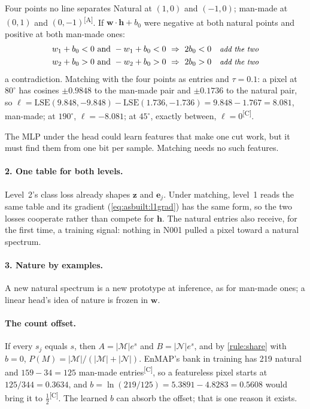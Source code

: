 \documentclass[11pt,a4paper,oneside,openany]{book}
\newcommand{\B}[1]{{\symbf{#1}}}
\newcommand{\B}[1]{{\bm{#1}}}
\newcommand{\comp}{\textsuperscript{\textsf{\scriptsize[C]}}}
\newcommand{\assm}{\textsuperscript{\textsf{\scriptsize[A]}}}
\newcommand{\ve}{\B{e}}
\newcommand{\vw}{\B{w}}
\newcommand{\vz}{\B{z}}
\newcommand{\vh}{\B{h}}
\newcommand{\why}[1]{&&\text{\small\itshape #1}}
\begin{document}
\begin{worked}[label=we:asbuilt:xor]{Four points no line separates}
Natural at $(1,0)$ and $(-1,0)$; man-made at $(0,1)$ and $(0,-1)$\assm. If $\vw\cdot\vh+b_0$ were negative at both natural points and positive at both man-made ones:
\begin{align*}
w_1+b_0<0\ \text{and}\ -w_1+b_0<0 &\ \Rightarrow\ 2b_0<0 \why{add the two}\\
w_2+b_0>0\ \text{and}\ -w_2+b_0>0 &\ \Rightarrow\ 2b_0>0 \why{add the two}
\end{align*}
a contradiction. Matching with the four points as entries and $\tau=0.1$: a pixel at $80^\circ$ has cosines $\pm0.9848$ to the man-made pair and $\pm0.1736$ to the natural
pair, so $\ell=\mathrm{LSE}(9.848,-9.848)-\mathrm{LSE}(1.736,-1.736)=9.848-1.767=8.081$, man-made; at $190^\circ$, $\ell=-8.081$; at $45^\circ$, exactly between, $\ell=0$\comp.
\end{worked}

The MLP under the head could learn features that make one cut work, but it must find them from one bit per sample. Matching needs no such features.

\paragraph{2. One table for both levels.} Level~2's class loss already shapes $\vz$ and $\ve_j$. Under matching, level~1 reads the same table and its gradient
(\cref{eq:asbuilt:l1grad}) has the same form, so the two losses cooperate rather than compete for $\vh$. The natural entries also receive, for the first time, a training
signal: nothing in N001 pulled a pixel toward a natural spectrum.

\paragraph{3. Nature by examples.} A new natural spectrum is a new prototype at inference, as for man-made ones; a linear head's idea of nature is frozen in $\vw$.

\paragraph{The count offset.} If every $s_j$ equals $s$, then $A=|\mathcal M|e^{s}$ and $B=|\mathcal N|e^{s}$, and by \cref{rule:share} with $b=0$,
$P(M)=|\mathcal M|/(|\mathcal M|+|\mathcal N|)$. EnMAP's bank in training has 219 natural and $159-34=125$ man-made entries\comp, so a featureless pixel starts at
$125/344=0.3634$, and $b=\ln(219/125)=5.3891-4.8283=0.5608$ would bring it to $\tfrac12$\comp. The learned $b$ can absorb the offset; that is one reason it exists.
\end{document}
